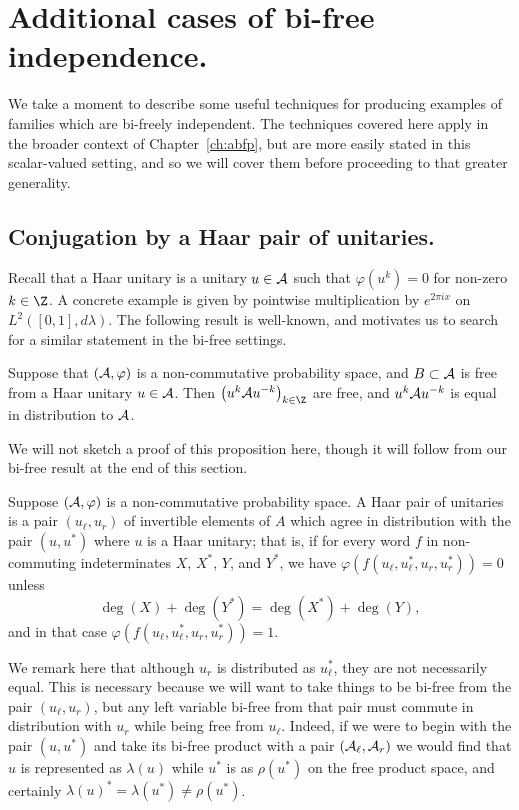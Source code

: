 \section{Additional cases of bi-free independence.}
\label{sec:morebifreeexamples}
We take a moment to describe some useful techniques for producing examples of families which are bi-freely independent.
The techniques covered here apply in the broader context of Chapter~\ref{ch:abfp}, but are more easily stated in this scalar-valued setting, and so we will cover them before proceeding to that greater generality.

\subsection{Conjugation by a Haar pair of unitaries.}
\label{ssec:haarunitary}
Recall that a Haar unitary is a unitary $u \in \mathcal{A}$ such that $\varphi(u^k) = 0$ for non-zero $k \in \Z$.
A concrete example is given by pointwise multiplication by $e^{2\pi i x}$ on $L^2([0, 1], d\lambda)$.
The following result is well-known, and motivates us to search for a similar statement in the bi-free settings.

\begin{proposition}
	Suppose that $(\mathcal{A}, \varphi)$ is a non-commutative probability space, and $B \subset \mathcal{A}$ is free from a Haar unitary $u \in \mathcal{A}$.
	Then $\paren{u^k\A u^{-k}}_{k\in\Z}$ are free, and $u^k\mathcal{A} u^{-k}$ is equal in distribution to $\mathcal{A}$.
\end{proposition}

We will not sketch a proof of this proposition here, though it will follow from our bi-free result at the end of this section.

\begin{definition}
	Suppose $(\mathcal{A}, \varphi)$ is a non-commutative probability space.
	A Haar pair of unitaries is a pair $(u_\ell, u_r)$ of invertible elements of $A$ which agree in distribution with the pair $(u, u^*)$ where $u$ is a Haar unitary; that is, if for every word $f$ in non-commuting indeterminates $X$, $X^*$, $Y$, and $Y^*$, we have $\varphi(f(u_\ell, u_\ell^*, u_r, u_r^*)) = 0$ unless
	$$\deg(X) + \deg(Y^*) = \deg(X^*) + \deg(Y),$$
	and in that case $\varphi(f(u_\ell, u_\ell^*, u_r, u_r^*)) = 1$.
\end{definition}
We remark here that although $u_r$ is distributed as $u_\ell^*$, they are not necessarily equal.
This is necessary because we will want to take things to be bi-free from the pair $(u_\ell, u_r)$, but any left variable bi-free from that pair must commute in distribution with $u_r$ while being free from $u_\ell$.
Indeed, if we were to begin with the pair $(u, u^*)$ and take its bi-free product with a pair $(\mathcal{A}_\ell, \mathcal{A}_r)$ we would find that $u$ is represented as $\lambda(u)$ while $u^*$ is as $\rho(u^*)$ on the free product space, and certainly $\lambda(u)^* = \lambda(u^*) \neq \rho(u^*)$.

